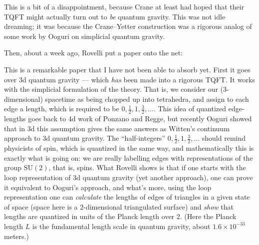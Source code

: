 \documentclass[12pt]{article}
\def\tightlist{}
\renewcommand{\texttt}[1]{%
  \begingroup
  \ttfamily
  \begingroup\lccode`~=`/\lowercase{\endgroup\def~}{/\discretionary{}{}{}}%
  \begingroup\lccode`~=`[\lowercase{\endgroup\def~}{[\discretionary{}{}{}}%
  \begingroup\lccode`~=`.\lowercase{\endgroup\def~}{.\discretionary{}{}{}}%
  \catcode`/=\active\catcode`[=\active\catcode`.=\active
  \scantokens{#1\noexpand}%
  \endgroup
}
\begin{document}
This is a bit of a disappointment, because Crane at least had hoped that
their TQFT might actually turn out to \emph{be} quantum gravity. This
was not idle dreaming; it was because the Crane--Yetter construction was
a rigorous analog of some work by Ooguri on simplicial quantum gravity.

Then, about a week ago, Rovelli put a paper onto the net:


This is a remarkable paper that I have not been able to absorb yet.
First it goes over 3d quantum gravity --- which \emph{has} been made
into a rigorous TQFT. It works with the simplicial formulation of the
theory. That is, we consider our (3-dimensional) spacetime as being
chopped up into tetrahedra, and assign to each edge a length, which is
required to be \(0,\frac{1}{2},1,\frac{3}{2},\ldots\). This idea of quantized
edge-lengths goes back to 4d work of Ponzano and Regge, but recently
Ooguri showed that in 3d this assumption gives the same answers as
Witten's continuum approach to 3d quantum gravity. The ``half-integers''
\(0,\frac{1}{2},1,\frac{3}{2},\ldots\) should remind physicists of spin, which is
quantized in the same way, and mathematically this is exactly what is
going on: we are really labelling edges with representations of the
group \(\mathrm{SU}(2)\), that is, spins. What Rovelli shows is that if
one starts with the loop representation of 3d quantum gravity (yet
another approach), one can prove it equivalent to Ooguri's approach, and
what's more, using the loop representation one can \emph{calculate} the
lengths of edges of triangles in a given state of space (space here is a
\(2\)-dimensional triangulated surface) and \emph{show} that lengths are
quantized in units of the Planck length over 2. (Here the Planck length
\(L\) is the fundamental length scale in quantum gravity, about
\(1.6 \times 10^{-33}\) meters.)
\end{document}
